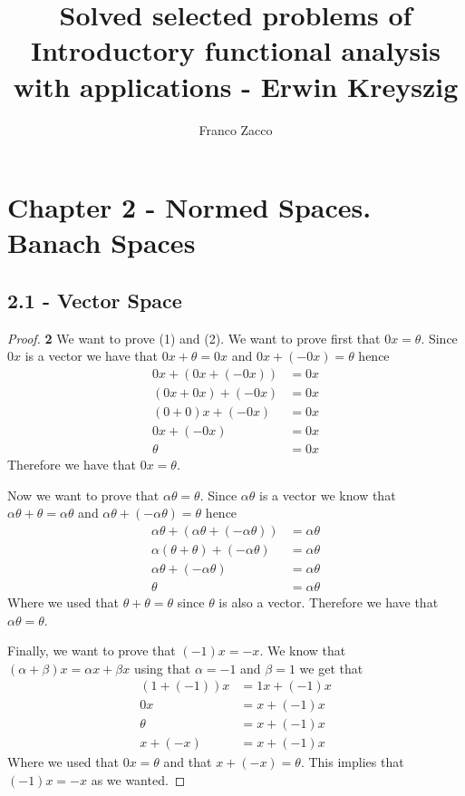 \documentclass[11pt]{article}
\title{\textbf{Solved selected problems of Introductory functional analysis with applications - Erwin Kreyszig}}
\author{Franco Zacco}
\date{}
\theoremstyle{definition}
\begin{document}
\maketitle
\thispagestyle{empty}

\section*{Chapter 2 - Normed Spaces. Banach Spaces}
\subsection*{2.1 - Vector Space}
\begin{proof}{\textbf{2}}
    We want to prove (1) and (2). We want to prove first that $0x = \theta$.
    Since $0x$ is a vector we have that $0x + \theta = 0x$
    and $0x + (-0x) = \theta$ hence
    \begin{align*}
        0x + (0x + (-0x)) &= 0x\\
        (0x + 0x) + (-0x) &= 0x\\
        (0 + 0)x + (-0x) &= 0x\\
        0x + (-0x) &= 0x\\
        \theta &= 0x
    \end{align*}
    Therefore we have that $0x = \theta$.

    Now we want to prove that $\alpha\theta = \theta$. Since $\alpha\theta$ is a
    vector we know that $\alpha\theta + \theta = \alpha\theta$ and 
    $\alpha\theta + (-\alpha\theta) = \theta$ hence
    \begin{align*}
        \alpha\theta + (\alpha\theta + (-\alpha\theta)) &= \alpha\theta\\
        \alpha(\theta + \theta) + (-\alpha\theta) &= \alpha\theta\\
        \alpha\theta + (-\alpha\theta) &= \alpha\theta\\
        \theta &= \alpha\theta
    \end{align*}
    Where we used that $\theta + \theta = \theta$ since $\theta$ is also a
    vector. Therefore we have that $\alpha\theta = \theta$.

    Finally, we want to prove that $(-1)x = -x$. We know that
    $(\alpha + \beta)x = \alpha x + \beta x$ using that $\alpha = -1$ and 
    $\beta = 1$ we get that
    \begin{align*}
        (1 + (-1))x &= 1x + (-1)x\\
        0x &= x + (-1)x\\
        \theta &= x + (-1)x\\
        x + (-x) &= x + (-1)x
    \end{align*}
    Where we used that $0x = \theta$ and that $x + (-x) = \theta$.
    This implies that $(-1)x = -x$ as we wanted.
\end{proof}
\end{document}
